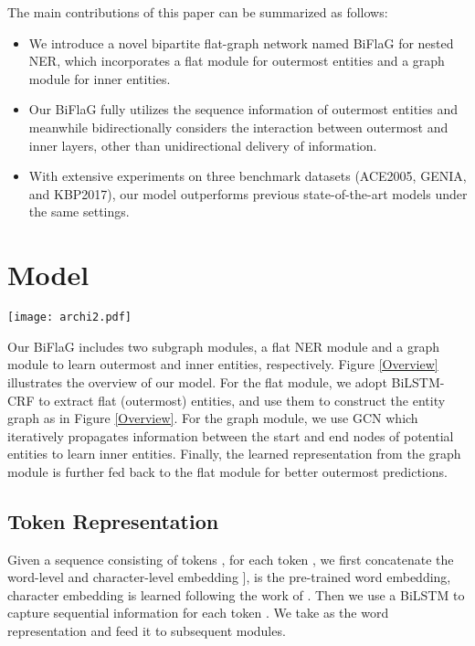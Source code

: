 \documentclass[11pt,a4paper]{article}
\begin{document}
The main contributions of this paper can be summarized as follows:
\begin{itemize}
    \item We introduce a novel bipartite flat-graph network named BiFlaG for nested NER, which incorporates a flat module for outermost entities and a graph module for inner entities.
    \item Our BiFlaG fully utilizes the sequence information of outermost entities and meanwhile bidirectionally considers the interaction between outermost and inner layers, other than unidirectional delivery of information.
    \item With extensive experiments on three benchmark datasets (ACE2005, GENIA, and KBP2017), our model outperforms previous state-of-the-art models under the same settings.
\end{itemize} 

\section{Model}

\begin{figure*}[!t]
  \centering 
  \texttt{[image: archi2.pdf]} 
    \caption{The framework of our BiFlaG model.  and  are entity graph and adjacent graph created for GCN, each dashed line connects the start and end nodes for a potential entity. Solid red lines indicate inner entities recognized by the graph module.}\label{Overview}
\end{figure*} 


Our BiFlaG includes two subgraph modules, a flat NER module and a graph module to learn outermost and inner entities, respectively. Figure \ref{Overview} illustrates the overview of our model.
For the flat module, we adopt BiLSTM-CRF to extract flat (outermost) entities, and use them to construct the entity graph  as in Figure \ref{Overview}.
For the graph module, we use GCN which iteratively propagates information between the start and end nodes of potential entities to learn inner entities. Finally, the learned representation from the graph module is further fed back to the flat module for better outermost predictions.


\subsection{Token Representation}
Given a sequence consisting of  tokens , for each token , we first concatenate the word-level and character-level embedding  ],  is the pre-trained word embedding, character embedding  is learned following the work of \cite{xin2018learning}. Then we use a BiLSTM to capture sequential information for each token .
We take  as the word representation and feed it to subsequent modules. 
\end{document}
